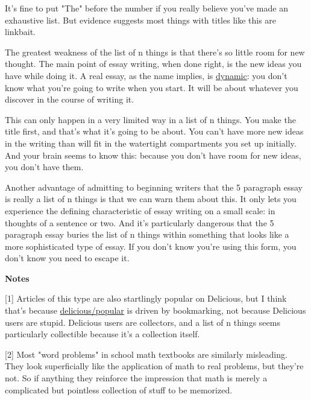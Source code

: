 It's fine to put "The" before the
                  number if you really believe you've made an exhaustive list.
                  But evidence suggests most things with titles like this are
                  linkbait.

The greatest weakness of the list of n
                  things is that there's so little room for new thought. The
                  main point of essay writing, when done right, is the new ideas
                  you have while doing it. A real essay, as the name implies, is
                  \href{http://www.paulgraham.com/essay.html}{dynamic}: you don't know what you're
                  going to write when you start. It will be about whatever you
                  discover in the course of writing it.

This can only
                  happen in a very limited way in a list of n things. You make
                  the title first, and that's what it's going to be about. You
                  can't have more new ideas in the writing than will fit in the
                  watertight compartments you set up initially. And your brain
                  seems to know this: because you don't have room for new ideas,
                  you don't have them.

Another advantage of admitting
                  to beginning writers that the 5 paragraph essay is really a
                  list of n things is that we can warn them about this. It only
                  lets you experience the defining characteristic of essay
                  writing on a small scale: in thoughts of a sentence or two.
                  And it's particularly dangerous that the 5 paragraph essay
                  buries the list of n things within something that looks like a
                  more sophisticated type of essay. If you don't know you're
                  using this form, you don't know you need to escape it.





\textbf{Notes}

[1] Articles of this type are also startlingly popular on
                  Delicious, but I think that's because
                  \href{http://delicious.com/popular}{delicious/popular}
                  is driven by bookmarking, not because Delicious users are
                  stupid. Delicious users are collectors, and a list of n things
                  seems particularly collectible because it's a collection
                  itself.

[2] Most "word problems" in school math textbooks are similarly
                  misleading. They look superficially like the application of
                  math to real problems, but they're not. So if anything they
                  reinforce the impression that math is merely a complicated but
                  pointless collection of stuff to be memorized.






              
            
          
